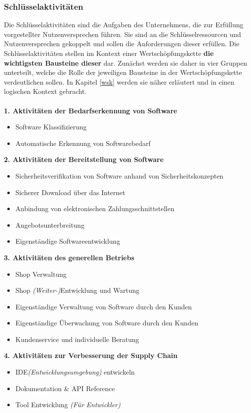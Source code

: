 \subsubsection{Schlüsselaktivitäten}\label{key_activities}
Die Schlüsselaktivitäten sind die Aufgaben des Unternehmens, die zur Erfüllung vorgestellter Nutzenversprechen führen. Sie sind an die Schlüsselressourcen und Nutzenversprechen gekoppelt und sollen die Anforderungen dieser erfüllen. Die Schlüsselaktivitäten stellen im Kontext einer Wertschöpfungskette \textbf{die wichtigsten Bausteine dieser} dar. Zunächst werden sie daher in vier Gruppen unterteilt, welche die Rolle der jeweiligen Bausteine in der Wertschöpfungskette verdeutlichen sollen. In Kapitel \ref{wsk} werden sie näher erläutert und in einen logischen Kontext gebracht.\\\\
\textbf{1. Aktivitäten der Bedarfserkennung von Software}
\begin{itemize}
	\item Software Klassifizierung
	\item Automatische Erkennung von Softwarebedarf
\end{itemize}
\vspace{0.2cm}
\textbf{2. Aktivitäten der Bereitstellung von Software}
\begin{itemize}
	\item Sicherheitsverifikation von Software anhand von Sicherheitskonzepten
	\item Sicherer Download über das Internet 
	\item Anbindung von elektronischen Zahlungsschnittstellen
	\item Angebotsunterbreitung
	\item Eigenständige Softwareentwicklung
\end{itemize}
\vspace{0.2cm}
\textbf{3. Aktivitäten des generellen Betriebs}
\begin{itemize}
	\item Shop Verwaltung
	\item Shop \textit{(Weiter-)}Entwicklung und Wartung
	\item Eigenständige Verwaltung von Software durch den Kunden
	\item Eigenständige Überwachung von Software durch den Kunden
	\item Kundenservice und individuelle Beratung
\end{itemize}
\vspace{0.2cm}
\textbf{4. Aktivitäten zur Verbesserung der Supply Chain}
\begin{itemize}
	\item IDE\textit{(Entwicklungsumgebung)} entwickeln
	\item Dokumentation \& API Reference
	\item Tool Entwicklung \textit{(Für Entwickler)}
\end{itemize}

